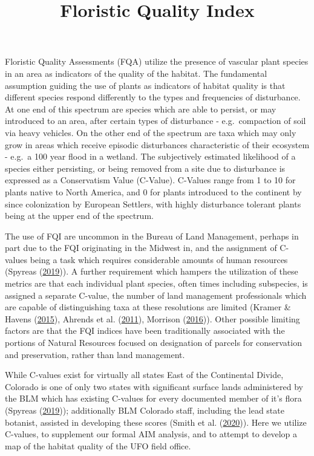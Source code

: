 \documentclass[
]{article}
\title{Floristic Quality Index}
\author{}
\date{\vspace{-2.5em}}
\begin{document}
\maketitle

\vspace{-1cm}

Floristic Quality Assessments (FQA) utilize the presence of vascular
plant species in an area as indicators of the quality of the habitat.
The fundamental assumption guiding the use of plants as indicators of
habitat quality is that different species respond differently to the
types and frequencies of disturbance. At one end of this spectrum are
species which are able to persist, or may introduced to an area, after
certain types of disturbance - e.g.~compaction of soil via heavy
vehicles. On the other end of the spectrum are taxa which may only grow
in areas which receive episodic disturbances characteristic of their
ecosystem - e.g.~a 100 year flood in a wetland. The subjectively
estimated likelihood of a species either persisting, or being removed
from a site due to disturbance is expressed as a Conservatism Value
(C-Value). C-Values range from 1 to 10 for plants native to North
America, and 0 for plants introduced to the continent by since
colonization by European Settlers, with highly disturbance tolerant
plants being at the upper end of the spectrum.

The use of FQI are uncommon in the Bureau of Land Management, perhaps in
part due to the FQI originating in the Midwest in, and the assignment of
C-values being a task which requires considerable amounts of human
resources (Spyreas
(\protect\hyperlink{ref-spyreas2019floristic}{2019})). A further
requirement which hampers the utilization of these metrics are that each
individual plant species, often times including subspecies, is assigned
a separate C-value, the number of land management professionals which
are capable of distinguishing taxa at these resolutions are limited
(Kramer \& Havens (\protect\hyperlink{ref-kramer2015report}{2015}),
Ahrends et al. (\protect\hyperlink{ref-ahrends2011conservation}{2011}),
Morrison (\protect\hyperlink{ref-morrison2016observer}{2016})). Other
possible limiting factors are that the FQI indices have been
traditionally associated with the portions of Natural Resources focused
on designation of parcels for conservation and preservation, rather than
land management.

While C-values exist for virtually all states East of the Continental
Divide, Colorado is one of only two states with significant surface
lands administered by the BLM which has existing C-values for every
documented member of it's flora (Spyreas
(\protect\hyperlink{ref-spyreas2019floristic}{2019})); additionally BLM
Colorado staff, including the lead state botanist, assisted in
developing these scores (Smith et al.
(\protect\hyperlink{ref-cnhp2020fqi}{2020})). Here we utilize C-values,
to supplement our formal AIM analysis, and to attempt to develop a map
of the habitat quality of the UFO field office.
\end{document}
